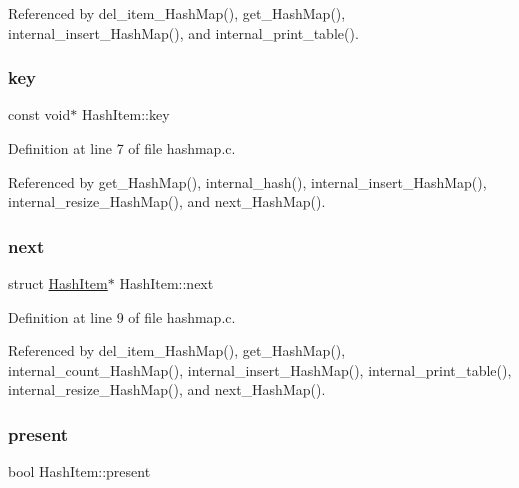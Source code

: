 Referenced by del\+\_\+item\+\_\+\+Hash\+Map(), get\+\_\+\+Hash\+Map(), internal\+\_\+insert\+\_\+\+Hash\+Map(), and internal\+\_\+print\+\_\+table().

\mbox{\label{structHashItem_a0bd79196ef574b956a40b009950a1ef4}} 
\subsubsection{\texorpdfstring{key}{key}}
{\footnotesize\ttfamily const void$\ast$ Hash\+Item\+::key}



Definition at line 7 of file hashmap.\+c.



Referenced by get\+\_\+\+Hash\+Map(), internal\+\_\+hash(), internal\+\_\+insert\+\_\+\+Hash\+Map(), internal\+\_\+resize\+\_\+\+Hash\+Map(), and next\+\_\+\+Hash\+Map().

\mbox{\label{structHashItem_a623917e154bb2a360da5cbc9d3329171}} 
\subsubsection{\texorpdfstring{next}{next}}
{\footnotesize\ttfamily struct \mbox{\hyperlink{structHashItem}{Hash\+Item}}$\ast$ Hash\+Item\+::next}



Definition at line 9 of file hashmap.\+c.



Referenced by del\+\_\+item\+\_\+\+Hash\+Map(), get\+\_\+\+Hash\+Map(), internal\+\_\+count\+\_\+\+Hash\+Map(), internal\+\_\+insert\+\_\+\+Hash\+Map(), internal\+\_\+print\+\_\+table(), internal\+\_\+resize\+\_\+\+Hash\+Map(), and next\+\_\+\+Hash\+Map().

\mbox{\label{structHashItem_a7fe892239fc6fb4cef7e2f2cf1581b1f}} 
\subsubsection{\texorpdfstring{present}{present}}
{\footnotesize\ttfamily bool Hash\+Item\+::present}



